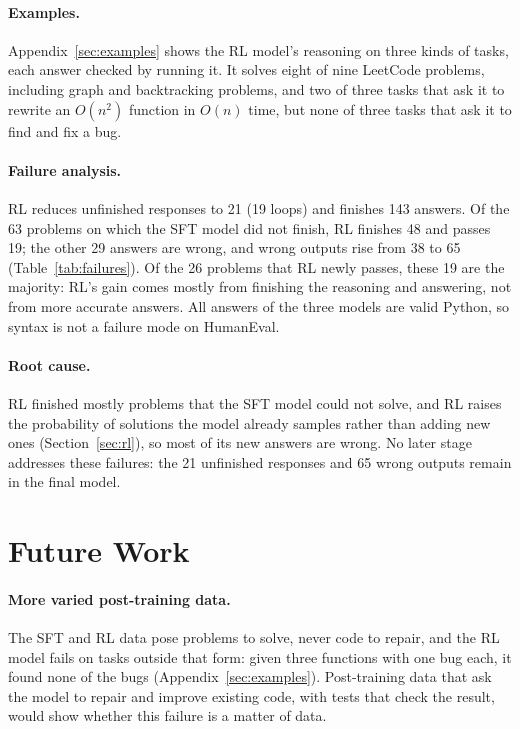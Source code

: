 \documentclass[sigconf,nonacm,balance=false]{acmart}
\begin{document}
\paragraph{Examples.} Appendix~\ref{sec:examples} shows the RL model's reasoning on three kinds of tasks, each answer
checked by running it. It solves eight of nine LeetCode problems, including graph and backtracking problems, and two of
three tasks that ask it to rewrite an $O(n^2)$ function in $O(n)$ time, but none of three tasks that ask it to find and
fix a bug.

\paragraph{Failure analysis.} RL reduces unfinished responses to 21 (19 loops) and finishes 143 answers. Of the 63
problems on which the SFT model did not finish, RL finishes 48 and passes 19; the other 29 answers are wrong, and wrong
outputs rise from 38 to 65 (Table~\ref{tab:failures}). Of the 26 problems that RL newly passes, these 19 are the
majority: RL's gain comes mostly from finishing the reasoning and answering, not from more accurate answers. All
answers of the three models are valid Python, so syntax is not a failure mode on HumanEval.

\paragraph{Root cause.} RL finished mostly problems that the SFT model could not solve, and RL raises the probability
of solutions the model already samples rather than adding new ones (Section~\ref{sec:rl}), so most of its new answers
are wrong. No later stage addresses these failures: the 21 unfinished responses and 65 wrong outputs remain in the
final model.

\section{Future Work}
\label{sec:future}

\paragraph{More varied post-training data.} The SFT and RL data pose problems to solve, never code to repair, and the
RL model fails on tasks outside that form: given three functions with one bug each, it found none of the bugs
(Appendix~\ref{sec:examples}). Post-training data that ask the model to repair and improve existing code, with tests
that check the result, would show whether this failure is a matter of data.
\end{document}
